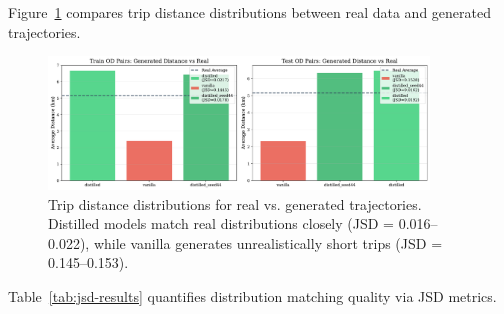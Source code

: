 Figure~\ref{fig:distance-distributions} compares trip distance distributions between real data and generated trajectories.

\begin{figure}[h]
    \centering
    \includegraphics[width=0.9\textwidth]{assets/plots/hoser/distance_distributions.pdf}
    \caption{Trip distance distributions for real vs. generated trajectories. Distilled models match real distributions closely (JSD = 0.016--0.022), while vanilla generates unrealistically short trips (JSD = 0.145--0.153).}
    \label{fig:distance-distributions}
\end{figure}

Table~\ref{tab:jsd-results} quantifies distribution matching quality via JSD metrics.


